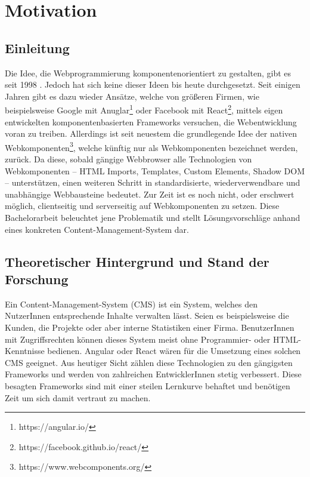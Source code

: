 \chapter{Motivation}

\section{Einleitung}

Die Idee, die Webprogrammierung komponentenorientiert zu gestalten, gibt es seit 1998 \cite{microsoft-webcomponents}. Jedoch hat sich keine dieser Ideen bis heute durchgesetzt.
Seit einigen Jahren gibt es dazu wieder Ansätze, welche von größeren Firmen, wie beispielsweise Google mit Anuglar\footnote{https://angular.io/} oder Facebook mit React\footnote{https://facebook.github.io/react/}, mittels eigen entwickelten komponentenbasierten Frameworks versuchen, die Webentwicklung voran zu treiben. 
Allerdings ist seit neuestem die grundlegende Idee der nativen Webkomponenten\footnote{https://www.webcomponents.org/}, welche künftig nur als Webkomponenten bezeichnet werden, zurück. Da diese, sobald gängige Webbrowser alle Technologien von Webkomponenten -- HTML Imports, Templates, Custom Elements, Shadow DOM -- unterstützen, einen weiteren Schritt in standardisierte, wiederverwendbare und unabhängige Webbausteine bedeutet. Zur Zeit ist es noch nicht, oder erschwert möglich, clientseitig und  serverseitig auf Webkomponenten zu setzen.
Diese Bachelorarbeit beleuchtet jene Problematik und stellt Lösungsvorschläge anhand eines konkreten Content-Management-System dar.


\section{Theoretischer Hintergrund und Stand der Forschung}
\label{sec:hintergrund}

Ein Content-Management-System (CMS) ist ein System, welches den NutzerInnen entsprechende Inhalte verwalten lässt. Seien es beispielsweise die Kunden, die Projekte oder aber interne Statistiken einer Firma. BenutzerInnen mit Zugriffsrechten können dieses System meist ohne Programmier- oder HTML-Kenntnisse bedienen.
Angular oder React wären für die Umsetzung eines solchen CMS geeignet. Aus heutiger Sicht zählen diese Technologien zu den gängigsten Frameworks und werden von zahlreichen EntwicklerInnen stetig verbessert.
Diese besagten Frameworks sind mit einer steilen Lernkurve behaftet und benötigen Zeit um sich damit vertraut zu machen.

